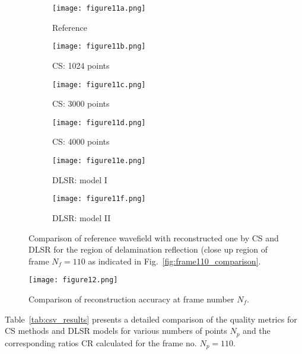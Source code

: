 \begin{figure} [!ht]
	\centering
	\begin{subfigure}[b]{0.32\textwidth}
		\centering
		\texttt{[image: figure11a.png]}
		\caption{Reference}
		\label{fig:frame110delam_ref}
	\end{subfigure}
	\hfill
	\begin{subfigure}[b]{0.32\textwidth}
		\centering
		\texttt{[image: figure11b.png]}
		\caption{CS: 1024 points}
		\label{fig:frame110delam_CS1024}
	\end{subfigure}
	\hfill
	\begin{subfigure}[b]{0.32\textwidth}
		\centering
		\texttt{[image: figure11c.png]}
		\caption{CS: 3000 points}
		\label{fig:frame110delam_CS3000}
	\end{subfigure}	
	\hfill
	\begin{subfigure}[b]{0.32\textwidth}
		\centering
		\texttt{[image: figure11d.png]}
		\caption{CS: 4000 points}
		\label{fig:frame110delam_CS4000}
	\end{subfigure}
	\hfill
	\begin{subfigure}[b]{0.32\textwidth}
		\centering
		\texttt{[image: figure11e.png]}
		\caption{DLSR: model I}
		\label{fig:frame110delam_Abdalraheem}
	\end{subfigure}
	\hfill
	\begin{subfigure}[b]{0.32\textwidth}
		\centering
		\texttt{[image: figure11f.png]}
		\caption{DLSR: model II}
		\label{fig:frame110delam_Saeed}
	\end{subfigure}
	
	\caption{Comparison of reference wavefield with reconstructed one by CS and DLSR for the region of delamination reflection (close up region of frame $N_f = 110$ as indicated in Fig.~\ref{fig:frame110_comparison}.}
	\label{fig:frame110del_comparison}
\end{figure} 
\clearpage
\begin{figure} [!ht]
	\centering
 	\texttt{[image: figure12.png]}
	\caption{Comparison of reconstruction accuracy at frame number $N_f$.}
	\label{fig:frame_metrics}
\end{figure}
\clearpage
Table~\ref{tab:csv_results} presents a detailed comparison of the quality metrics for CS methods and DLSR models for various numbers of points $N_p$ and the corresponding ratios CR calculated for the frame no. $N_p=110$.

